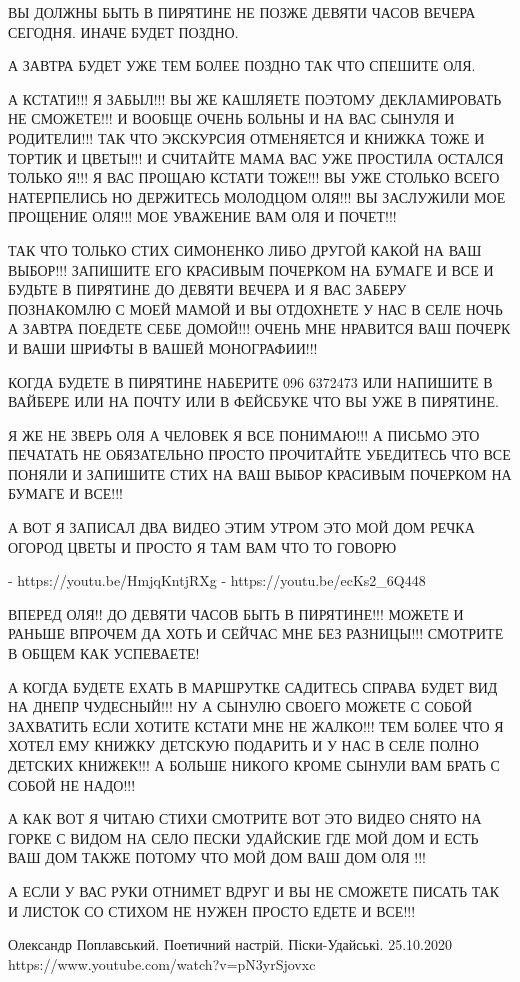 ВЫ ДОЛЖНЫ БЫТЬ В ПИРЯТИНЕ НЕ ПОЗЖЕ ДЕВЯТИ ЧАСОВ ВЕЧЕРА СЕГОДНЯ. ИНАЧЕ БУДЕТ ПОЗДНО.

А ЗАВТРА БУДЕТ УЖЕ ТЕМ БОЛЕЕ ПОЗДНО ТАК ЧТО СПЕШИТЕ ОЛЯ.

А КСТАТИ!!! Я ЗАБЫЛ!!! ВЫ ЖЕ КАШЛЯЕТЕ ПОЭТОМУ ДЕКЛАМИРОВАТЬ НЕ СМОЖЕТЕ!!!
И ВООБЩЕ ОЧЕНЬ БОЛЬНЫ И НА ВАС СЫНУЛЯ И РОДИТЕЛИ!!! ТАК ЧТО ЭКСКУРСИЯ ОТМЕНЯЕТСЯ И КНИЖКА ТОЖЕ И ТОРТИК И ЦВЕТЫ!!!
И СЧИТАЙТЕ МАМА ВАС УЖЕ ПРОСТИЛА ОСТАЛСЯ ТОЛЬКО Я!!! Я ВАС ПРОЩАЮ КСТАТИ ТОЖЕ!!!
ВЫ УЖЕ СТОЛЬКО ВСЕГО НАТЕРПЕЛИСЬ НО ДЕРЖИТЕСЬ МОЛОДЦОМ ОЛЯ!!! 
ВЫ ЗАСЛУЖИЛИ МОЕ ПРОЩЕНИЕ ОЛЯ!!! МОЕ УВАЖЕНИЕ ВАМ ОЛЯ И ПОЧЕТ!!!

ТАК ЧТО ТОЛЬКО СТИХ СИМОНЕНКО ЛИБО ДРУГОЙ КАКОЙ НА ВАШ ВЫБОР!!! 
ЗАПИШИТЕ ЕГО КРАСИВЫМ ПОЧЕРКОМ НА БУМАГЕ И ВСЕ И БУДЬТЕ В ПИРЯТИНЕ ДО ДЕВЯТИ ВЕЧЕРА И Я ВАС
ЗАБЕРУ ПОЗНАКОМЛЮ С МОЕЙ МАМОЙ И ВЫ ОТДОХНЕТЕ У НАС В СЕЛЕ НОЧЬ А ЗАВТРА ПОЕДЕТЕ СЕБЕ ДОМОЙ!!!
ОЧЕНЬ МНЕ НРАВИТСЯ ВАШ ПОЧЕРК И ВАШИ ШРИФТЫ В ВАШЕЙ МОНОГРАФИИ!!!

КОГДА БУДЕТЕ В ПИРЯТИНЕ НАБЕРИТЕ 096 6372473 ИЛИ НАПИШИТЕ В ВАЙБЕРЕ ИЛИ НА
ПОЧТУ ИЛИ В ФЕЙСБУКЕ ЧТО ВЫ УЖЕ В ПИРЯТИНЕ.

Я ЖЕ НЕ ЗВЕРЬ ОЛЯ А ЧЕЛОВЕК Я ВСЕ ПОНИМАЮ!!! А ПИСЬМО ЭТО ПЕЧАТАТЬ НЕ ОБЯЗАТЕЛЬНО ПРОСТО
ПРОЧИТАЙТЕ УБЕДИТЕСЬ ЧТО ВСЕ ПОНЯЛИ И ЗАПИШИТЕ СТИХ НА ВАШ ВЫБОР КРАСИВЫМ ПОЧЕРКОМ НА БУМАГЕ И ВСЕ!!!

А ВОТ Я ЗАПИСАЛ ДВА ВИДЕО ЭТИМ УТРОМ ЭТО МОЙ ДОМ 
РЕЧКА ОГОРОД ЦВЕТЫ И ПРОСТО Я ТАМ ВАМ ЧТО ТО ГОВОРЮ

- https://youtu.be/HmjqKntjRXg
- https://youtu.be/ecKs2_6Q448

ВПЕРЕД ОЛЯ!! ДО ДЕВЯТИ ЧАСОВ БЫТЬ В ПИРЯТИНЕ!!! 
МОЖЕТЕ И РАНЬШЕ ВПРОЧЕМ ДА ХОТЬ И СЕЙЧАС МНЕ БЕЗ РАЗНИЦЫ!!!
СМОТРИТЕ В ОБЩЕМ КАК УСПЕВАЕТЕ!

А КОГДА БУДЕТЕ ЕХАТЬ В МАРШРУТКЕ САДИТЕСЬ СПРАВА БУДЕТ ВИД НА ДНЕПР ЧУДЕСНЫЙ!!!
НУ А СЫНУЛЮ СВОЕГО МОЖЕТЕ С СОБОЙ ЗАХВАТИТЬ ЕСЛИ ХОТИТЕ КСТАТИ МНЕ НЕ ЖАЛКО!!!
ТЕМ БОЛЕЕ ЧТО Я ХОТЕЛ ЕМУ КНИЖКУ ДЕТСКУЮ ПОДАРИТЬ И У НАС В СЕЛЕ ПОЛНО 
ДЕТСКИХ КНИЖЕК!!! А БОЛЬШЕ НИКОГО КРОМЕ СЫНУЛИ ВАМ БРАТЬ С СОБОЙ НЕ НАДО!!!

А КАК ВОТ Я ЧИТАЮ СТИХИ СМОТРИТЕ ВОТ ЭТО ВИДЕО 
СНЯТО НА ГОРКЕ С ВИДОМ НА СЕЛО ПЕСКИ УДАЙСКИЕ ГДЕ МОЙ ДОМ 
И ЕСТЬ ВАШ ДОМ ТАКЖЕ ПОТОМУ ЧТО МОЙ ДОМ ВАШ ДОМ ОЛЯ !!!

А ЕСЛИ У ВАС РУКИ ОТНИМЕТ ВДРУГ И ВЫ НЕ СМОЖЕТЕ ПИСАТЬ ТАК И ЛИСТОК СО СТИХОМ 
НЕ НУЖЕН ПРОСТО ЕДЕТЕ И ВСЕ!!!

Олександр Поплавський. Поетичний настрій. Піски-Удайські. 25.10.2020
https://www.youtube.com/watch?v=pN3yrSjovxc

